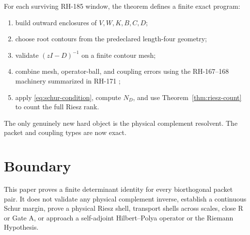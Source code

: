 \documentclass[12pt]{article}
\theoremstyle{remark}
\begin{document}
For each surviving RH-185 window, the theorem defines a finite exact program:
\begin{enumerate}[leftmargin=2em]
\item build outward enclosures of $V,W,K,B,C,D$;
\item choose root contours from the predeclared length-four geometry;
\item validate $(zI-D)^{-1}$ on a finite contour mesh;
\item combine mesh, operator-ball, and coupling errors using the RH-167--168
 machinery summarized in RH-171 \citep{WangRH171};
\item apply \eqref{eq:schur-condition}, compute $N_D$, and use
 Theorem~\ref{thm:riesz-count} to count the full Riesz rank.
\end{enumerate}
The only genuinely new hard object is the physical complement resolvent.
The packet and coupling types are now exact.

\section{Boundary}

This paper proves a finite determinant identity for every biorthogonal packet
pair.  It does not validate any physical complement inverse, establish a
continuous Schur margin, prove a physical Riesz shell, transport shells
across scales, close R or Gate A, or approach a self-adjoint Hilbert--Polya
operator or the Riemann Hypothesis.



\end{document}
